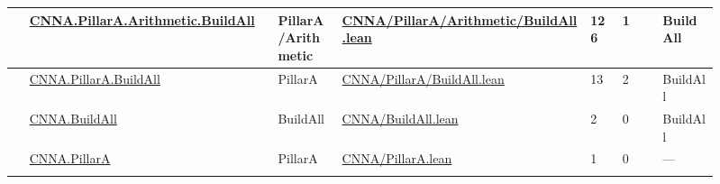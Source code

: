 \begin{longtable}{L{0.025\linewidth} L{0.315\linewidth} L{0.08\linewidth} L{0.315\linewidth} L{0.045\linewidth} L{0.055\linewidth} L{0.07\linewidth}}
\hline
{} & \href{run:repo_snapshot/CNNA/PillarA/Arithmetic/BuildAll.lean}{CNNA.\allowbreak{}PillarA.\allowbreak{}Arithmetic.\allowbreak{}BuildAll} & PillarA/\allowbreak{}Arithmetic & \href{run:repo_snapshot/CNNA/PillarA/Arithmetic/BuildAll.lean}{CNNA/\allowbreak{}PillarA/\allowbreak{}Arithmetic/\allowbreak{}BuildAll.\allowbreak{}lean} & 126 & 1 & BuildAll\\
\hline
{} & \href{run:repo_snapshot/CNNA/PillarA/BuildAll.lean}{CNNA.\allowbreak{}PillarA.\allowbreak{}BuildAll} & PillarA & \href{run:repo_snapshot/CNNA/PillarA/BuildAll.lean}{CNNA/\allowbreak{}PillarA/\allowbreak{}BuildAll.\allowbreak{}lean} & 13 & 2 & BuildAll\\
\hline
{} & \href{run:repo_snapshot/CNNA/BuildAll.lean}{CNNA.\allowbreak{}BuildAll} & BuildAll & \href{run:repo_snapshot/CNNA/BuildAll.lean}{CNNA/\allowbreak{}BuildAll.\allowbreak{}lean} & 2 & 0 & BuildAll\\
\hline
{} & \href{run:repo_snapshot/CNNA/PillarA.lean}{CNNA.\allowbreak{}PillarA} & PillarA & \href{run:repo_snapshot/CNNA/PillarA.lean}{CNNA/\allowbreak{}PillarA.\allowbreak{}lean} & 1 & 0 & ---\\
\hline
\addlinespace[0.24em]
\end{longtable}
\normalsize
